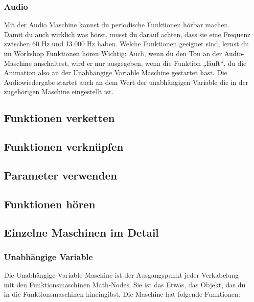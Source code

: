 \documentclass[12pt]{report}
\begin{document}
\subsubsection{Audio}
Mit der Audio Maschine kannst du periodische Funktionen hörbar machen. Damit du auch wirklich was hörst, musst du darauf achten, dass sie eine Frequenz zwischen 60 Hz und 13.000 Hz haben. Welche Funktionen geeignet sind, lernst du im Workshop Funktionen hören  
Wichtig: Auch, wenn du den Ton an der Audio-Maschine anschaltest, wird er nur ausgegeben, wenn die Funktion „läuft“, du die Animation also an der Unabhängige Variable Maschine gestartet hast. Die Audiowiedergabe startet auch an dem Wert der unabhängigen Variable die in der zugehörigen Maschine eingestellt ist.
\subsection{Funktionen verketten}
\subsection{Funktionen verknüpfen}
\subsection{Parameter verwenden}
\subsection{Funktionen hören}
\subsection{Einzelne Maschinen im Detail}
\subsubsection{Unabhängige Variable}
Die Unabhängige-Variable-Maschine ist der Ausgangspunkt jeder Verkabelung mit den Funktionsmaschinen Math-Nodes. Sie ist das Etwas, das Objekt, das du in die Funktionsmaschinen hineingibst. Die Maschine hat folgende Funktionen:
\end{document}
